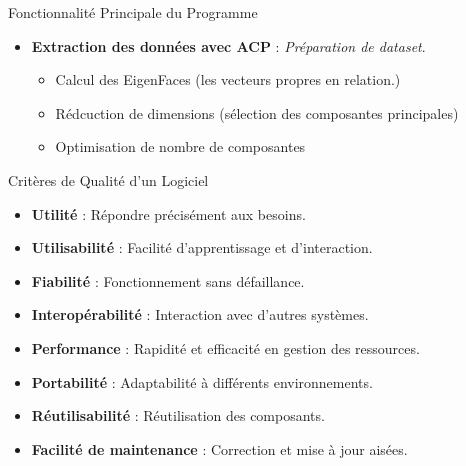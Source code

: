 \documentclass{beamer}
\begin{document}
\begin{frame}{Fonctionnalité Principale du Programme}
    \begin{itemize}
        \item \textbf{Extraction des données avec ACP} : \textit{Préparation de dataset}.
        \begin{itemize}
            \item Calcul des EigenFaces (les vecteurs propres en relation.)
            \item Rédcuction de dimensions (sélection des composantes principales)
            \item Optimisation de nombre de composantes
        \end{itemize}
    \end{itemize}
\end{frame}

\begin{frame}{Critères de Qualité d’un Logiciel}
    \begin{itemize}
        \item \textbf{Utilité} : Répondre précisément aux besoins.
        \item \textbf{Utilisabilité} : Facilité d'apprentissage et d'interaction.
        \item \textbf{Fiabilité} : Fonctionnement sans défaillance.
        \item \textbf{Interopérabilité} : Interaction avec d'autres systèmes.
        \item \textbf{Performance} : Rapidité et efficacité en gestion des ressources.
        \item \textbf{Portabilité} : Adaptabilité à différents environnements.
        \item \textbf{Réutilisabilité} : Réutilisation des composants.
        \item \textbf{Facilité de maintenance} : Correction et mise à jour aisées.
    \end{itemize}
\end{frame}
\end{document}
